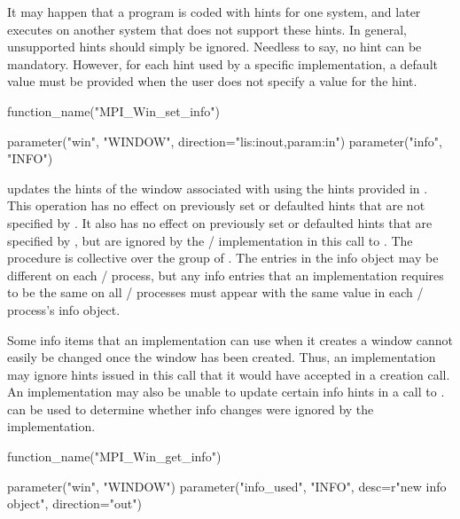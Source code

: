 \begin{implementors}
It may happen that a program is coded with hints for one system, and
later executes on another system that does not support these hints.
In general, unsupported hints should simply be ignored.
Needless to say, no hint can be mandatory.
However, for each hint used by a specific implementation,
a default value must be provided
when the user does not specify a value for
the hint. 
\end{implementors}

%
%
\begin{mpi-binding}
    function_name("MPI_Win_set_info")
    
    parameter("win", "WINDOW", direction="lis:inout,param:in")
    parameter("info", "INFO")
\end{mpi-binding}

 updates the hints of the window
associated with  using the hints provided in .
This operation has no effect on previously set or defaulted hints that
are not specified by .  It also has no effect on previously
set or defaulted hints that are specified by , but are
ignored by the \MPI/ implementation in this call to
.
The procedure is collective over the group of .
The entries in the info object may be different on each \mpi/ process,
but any info entries that an implementation requires to be the same on all \mpi/ processes
must appear with the same value in each \mpi/ process's info object.

\begin{users}
Some info items that an implementation can use when it creates a window
cannot easily be changed once the window has been created.
Thus, an implementation may ignore hints issued in this call that it would have accepted in a creation call.
An implementation may also be unable to update certain info hints in a call to .
 can be used to determine whether info
changes were ignored by the implementation.
\end{users}

%
%
\begin{mpi-binding}
    function_name("MPI_Win_get_info")
    
    parameter("win", "WINDOW")
    parameter("info_used", "INFO", desc=r"new info object", direction="out")
\end{mpi-binding}

